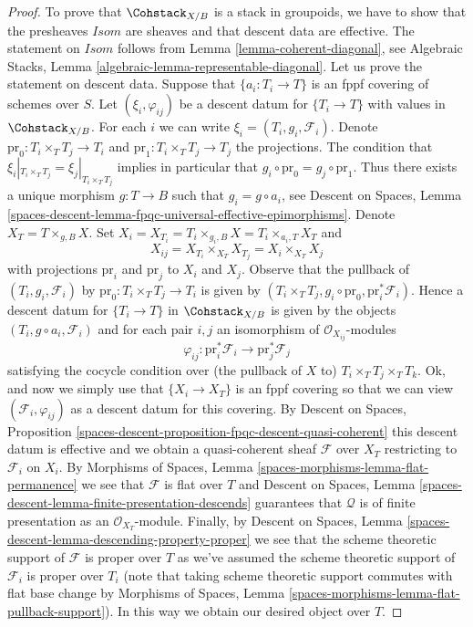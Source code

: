 \begin{proof}
To prove that $\Cohstack_{X/B}$ is a stack in groupoids, we have to show
that the presheaves $\mathit{Isom}$ are sheaves and that descent data are
effective. The statement on $\mathit{Isom}$ follows from
Lemma \ref{lemma-coherent-diagonal}, see
Algebraic Stacks, Lemma \ref{algebraic-lemma-representable-diagonal}.
Let us prove the statement on descent data.
Suppose that $\{a_i : T_i \to T\}$ is an fppf covering of schemes over $S$.
Let $(\xi_i, \varphi_{ij})$ be a descent datum for $\{T_i \to T\}$
with values in $\Cohstack_{X/B}$.
For each $i$ we can write $\xi_i = (T_i, g_i, \mathcal{F}_i)$.
Denote $\text{pr}_0 : T_i \times_T T_j \to T_i$ and
$\text{pr}_1 : T_i \times_T T_j \to T_j$ the projections.
The condition that $\xi_i|_{T_i \times_T T_j} = \xi_j|_{T_i \times_T T_j}$
implies in particular that $g_i \circ \text{pr}_0 = g_j \circ \text{pr}_1$.
Thus there exists a unique morphism $g : T \to B$ such that
$g_i = g \circ a_i$, see
Descent on Spaces, Lemma
\ref{spaces-descent-lemma-fpqc-universal-effective-epimorphisms}.
Denote $X_T = T \times_{g, B} X$. Set
$X_i = X_{T_i} = T_i \times_{g_i, B} X = T_i \times_{a_i, T} X_T$
and
$$
X_{ij} = X_{T_i} \times_{X_T} X_{T_j} = X_i \times_{X_T} X_j
$$
with projections $\text{pr}_i$ and $\text{pr}_j$ to $X_i$ and $X_j$.
Observe that the pullback of $(T_i, g_i, \mathcal{F}_i)$
by $\text{pr}_0 : T_i \times_T T_j \to T_i$ is given by
$(T_i \times_T T_j, g_i \circ \text{pr}_0, \text{pr}_i^*\mathcal{F}_i)$.
Hence a descent datum for $\{T_i \to T\}$ in $\Cohstack_{X/B}$
is given by the objects $(T_i, g \circ a_i, \mathcal{F}_i)$
and for each pair $i, j$ an isomorphism of $\mathcal{O}_{X_{ij}}$-modules
$$
\varphi_{ij} :
\text{pr}_i^*\mathcal{F}_i \longrightarrow \text{pr}_j^*\mathcal{F}_j
$$
satisfying the cocycle condition over (the pullback of $X$ to)
$T_i \times_T T_j \times_T T_k$.
Ok, and now we simply use that $\{X_i \to X_T\}$ is an fppf covering
so that we can view $(\mathcal{F}_i, \varphi_{ij})$ as a descent datum
for this covering. By
Descent on Spaces, Proposition
\ref{spaces-descent-proposition-fpqc-descent-quasi-coherent}
this descent datum is effective and we obtain a quasi-coherent
sheaf $\mathcal{F}$ over $X_T$ restricting to $\mathcal{F}_i$ on $X_i$.
By Morphisms of Spaces, Lemma \ref{spaces-morphisms-lemma-flat-permanence}
we see that $\mathcal{F}$ is flat over $T$ and
Descent on Spaces, Lemma
\ref{spaces-descent-lemma-finite-presentation-descends}
guarantees that $\mathcal{Q}$ is of finite presentation as an
$\mathcal{O}_{X_T}$-module. Finally, by
Descent on Spaces, Lemma \ref{spaces-descent-lemma-descending-property-proper}
we see that the scheme theoretic support of $\mathcal{F}$ is proper over
$T$ as we've assumed the scheme theoretic support of $\mathcal{F}_i$
is proper over $T_i$ (note that taking scheme theoretic support commutes
with flat base change by
Morphisms of Spaces, Lemma \ref{spaces-morphisms-lemma-flat-pullback-support}).
In this way we obtain our desired object over $T$.
\end{proof}


